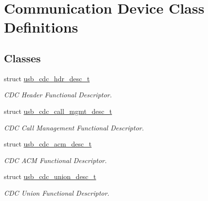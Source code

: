\hypertarget{group__cdc__protocol__group}{\section{Communication Device Class Definitions}
\label{group__cdc__protocol__group}
}
\subsection*{Classes}
\begin{DoxyCompactItemize}
\item 
struct \hyperlink{structusb__cdc__hdr__desc__t}{usb\-\_\-cdc\-\_\-hdr\-\_\-desc\-\_\-t}
\begin{DoxyCompactList}\small\item\em C\-D\-C Header Functional Descriptor. \end{DoxyCompactList}\item 
struct \hyperlink{structusb__cdc__call__mgmt__desc__t}{usb\-\_\-cdc\-\_\-call\-\_\-mgmt\-\_\-desc\-\_\-t}
\begin{DoxyCompactList}\small\item\em C\-D\-C Call Management Functional Descriptor. \end{DoxyCompactList}\item 
struct \hyperlink{structusb__cdc__acm__desc__t}{usb\-\_\-cdc\-\_\-acm\-\_\-desc\-\_\-t}
\begin{DoxyCompactList}\small\item\em C\-D\-C A\-C\-M Functional Descriptor. \end{DoxyCompactList}\item 
struct \hyperlink{structusb__cdc__union__desc__t}{usb\-\_\-cdc\-\_\-union\-\_\-desc\-\_\-t}
\begin{DoxyCompactList}\small\item\em C\-D\-C Union Functional Descriptor. \end{DoxyCompactList}\end{DoxyCompactItemize}
